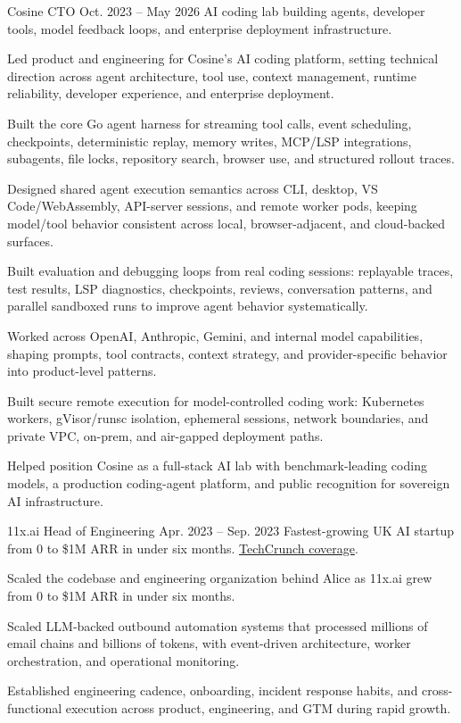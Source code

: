 
\ResumeJob
  {Cosine}
  {CTO}
  {Oct. 2023 -- May 2026}
  {AI coding lab building agents, developer tools, model feedback loops, and enterprise deployment infrastructure.}
\begin{ResumeList}
  \item Led product and engineering for Cosine's AI coding platform, setting technical direction across agent architecture, tool use, context management, runtime reliability, developer experience, and enterprise deployment.
  \item Built the core Go agent harness for streaming tool calls, event scheduling, checkpoints, deterministic replay, memory writes, MCP/LSP integrations, subagents, file locks, repository search, browser use, and structured rollout traces.
  \item Designed shared agent execution semantics across CLI, desktop, VS Code/WebAssembly, API-server sessions, and remote worker pods, keeping model/tool behavior consistent across local, browser-adjacent, and cloud-backed surfaces.
  \item Built evaluation and debugging loops from real coding sessions: replayable traces, test results, LSP diagnostics, checkpoints, reviews, conversation patterns, and parallel sandboxed runs to improve agent behavior systematically.
  \item Worked across OpenAI, Anthropic, Gemini, and internal model capabilities, shaping prompts, tool contracts, context strategy, and provider-specific behavior into product-level patterns.
  \item Built secure remote execution for model-controlled coding work: Kubernetes workers, gVisor/runsc isolation, ephemeral sessions, network boundaries, and private VPC, on-prem, and air-gapped deployment paths.
  \item Helped position Cosine as a full-stack AI lab with benchmark-leading coding models, a production coding-agent platform, and public recognition for sovereign AI infrastructure.
\end{ResumeList}

\ResumeJob
  {11x.ai}
  {Head of Engineering}
  {Apr. 2023 -- Sep. 2023}
  {Fastest-growing UK AI startup from 0 to \$1M ARR in under six months. \href{https://techcrunch.com/2023/08/11/11xai-closes-2-million-pre-seed-to-create-autonomous-ai-workers/}{TechCrunch coverage}.}
\begin{ResumeList}
  \item Scaled the codebase and engineering organization behind Alice as 11x.ai grew from 0 to \$1M ARR in under six months.
  \item Scaled LLM-backed outbound automation systems that processed millions of email chains and billions of tokens, with event-driven architecture, worker orchestration, and operational monitoring.
  \item Established engineering cadence, onboarding, incident response habits, and cross-functional execution across product, engineering, and GTM during rapid growth.
\end{ResumeList}

